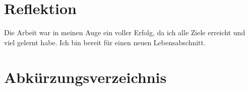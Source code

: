 \documentclass[
11pt, %
a4paper, %
BCOR25mm, %
DIV14, %
footsepline = false, %
headsepline, %
twoside, %
openright,
abstracton, %
listof=totocnumbered, %
bibliography=totocnumbered %
]{scrreprt}
\begin{document}
  \chapter{Reflektion}
  
  Die Arbeit war in meinen Auge ein voller Erfolg, da ich alle Ziele erreicht
  und viel gelernt habe. Ich bin bereit für einen neuen
  Lebensabschnitt.

  \cleardoublepage
  
  
  \appendix
  
%  
  
  
  \chapter{Abkürzungsverzeichnis}
  \begin{acronym}
    \setlength{\itemsep}{-\parsep}
  \end{acronym}
  
  
  \listoffigures
  
  
  \listoftables
  
  
  
  \cleardoublepage
  
\end{document}
